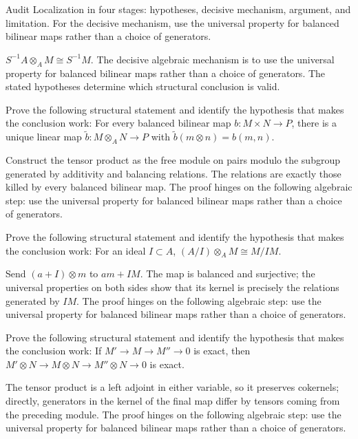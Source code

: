 \begin{problem}\label{prob:v10-problem-08}
Audit Localization in four stages: hypotheses, decisive mechanism, argument, and limitation. For the decisive mechanism, use the universal property for balanced bilinear maps rather than a choice of generators.
\end{problem}
\begin{solution}
$S^{-1}A\otimes_A M\cong S^{-1}M$. The decisive algebraic mechanism is to use the universal property for balanced bilinear maps rather than a choice of generators. The stated hypotheses determine which structural conclusion is valid.
\end{solution}

\begin{problem}\label{prob:v10-problem-09}
Prove the following structural statement and identify the hypothesis that makes the conclusion work: For every balanced bilinear map $b:M\times N\to P$, there is a unique linear map $\widetilde b:M\otimes_A N\to P$ with $\widetilde b(m\otimes n)=b(m,n)$.
\end{problem}
\begin{solution}
Construct the tensor product as the free module on pairs modulo the subgroup generated by additivity and balancing relations. The relations are exactly those killed by every balanced bilinear map. The proof hinges on the following algebraic step: use the universal property for balanced bilinear maps rather than a choice of generators.
\end{solution}

\begin{problem}\label{prob:v10-problem-10}
Prove the following structural statement and identify the hypothesis that makes the conclusion work: For an ideal $I\subset A$, $(A/I)\otimes_A M\cong M/IM$.
\end{problem}
\begin{solution}
Send $(a+I)\otimes m$ to $am+IM$. The map is balanced and surjective; the universal properties on both sides show that its kernel is precisely the relations generated by $I M$. The proof hinges on the following algebraic step: use the universal property for balanced bilinear maps rather than a choice of generators.
\end{solution}

\begin{problem}\label{prob:v10-problem-11}
Prove the following structural statement and identify the hypothesis that makes the conclusion work: If $M'\to M\to M''\to0$ is exact, then $M'\otimes N\to M\otimes N\to M''\otimes N\to0$ is exact.
\end{problem}
\begin{solution}
The tensor product is a left adjoint in either variable, so it preserves cokernels; directly, generators in the kernel of the final map differ by tensors coming from the preceding module. The proof hinges on the following algebraic step: use the universal property for balanced bilinear maps rather than a choice of generators.
\end{solution}

